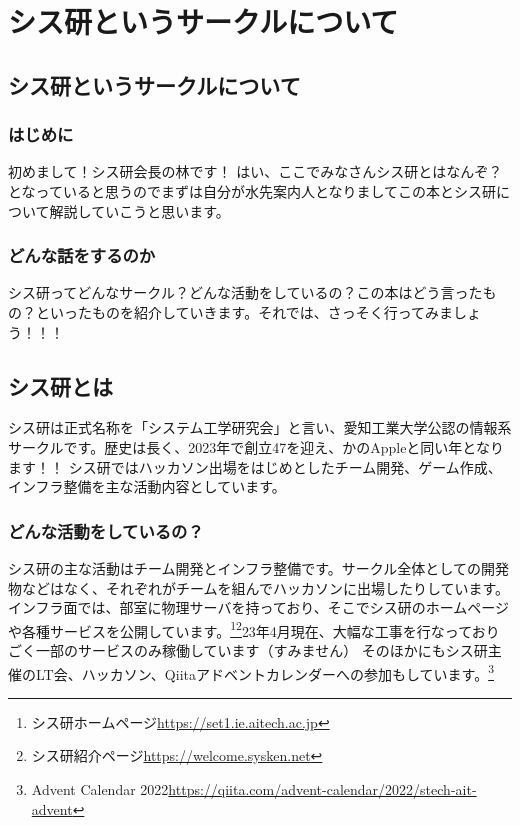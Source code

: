 \chapter{シス研というサークルについて}

\section{シス研というサークルについて}
\subsection{はじめに}
初めまして！シス研会長の林です！
はい、ここでみなさんシス研とはなんぞ？となっていると思うのでまずは自分が水先案内人となりましてこの本とシス研について解説していこうと思います。

\subsection{どんな話をするのか}
シス研ってどんなサークル？どんな活動をしているの？この本はどう言ったもの？といったものを紹介していきます。それでは、さっそく行ってみましょう！！！

\section{シス研とは}
シス研は正式名称を「システム工学研究会」と言い、愛知工業大学公認の情報系サークルです。歴史は長く、2023年で創立47を迎え、かのAppleと同い年となります！！
シス研ではハッカソン出場をはじめとしたチーム開発、ゲーム作成、インフラ整備を主な活動内容としています。

\subsection{どんな活動をしているの？}
シス研の主な活動はチーム開発とインフラ整備です。サークル全体としての開発物などはなく、それぞれがチームを組んでハッカソンに出場したりしています。
インフラ面では、部室に物理サーバを持っており、そこでシス研のホームページや各種サービスを公開しています。\footnote{シス研ホームページ\url{https://set1.ie.aitech.ac.jp}}\footnote{シス研紹介ページ\url{https://welcome.sysken.net}}23年4月現在、大幅な工事を行なっておりごく一部のサービスのみ稼働しています（すみません）
そのほかにもシス研主催のLT会、ハッカソン、Qiitaアドベントカレンダーへの参加もしています。\footnote{Advent Calendar 2022\url{https://qiita.com/advent-calendar/2022/stech-ait-advent}}

